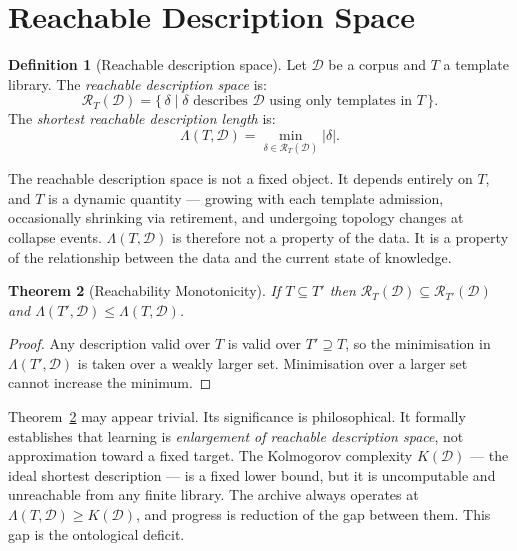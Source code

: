 \documentclass[11pt, a4paper, openany]{book}
\theoremstyle{plain}
\newtheorem{theorem}{Theorem}[chapter]
\theoremstyle{definition}
\newtheorem{definition}[theorem]{Definition}
\theoremstyle{remark}
\begin{document}
\section{Reachable Description Space}

\begin{definition}[Reachable description space]
  Let $\mathcal{D}$ be a corpus and $T$ a template library.
  The \emph{reachable description space} is:
  \[
    \mathcal{R}_T(\mathcal{D})
    = \bigl\{\, \delta \;\big|\;
      \delta \text{ describes } \mathcal{D}
      \text{ using only templates in } T \,\bigr\}.
  \]
  The \emph{shortest reachable description length} is:
  \[
    \Lambda(T, \mathcal{D})
    = \min_{\delta \in \mathcal{R}_T(\mathcal{D})} |\delta|.
  \]
\end{definition}

The reachable description space is not a fixed object.
It depends entirely on $T$, and $T$ is a dynamic quantity --- growing
with each template admission, occasionally shrinking via retirement,
and undergoing topology changes at collapse events.
$\Lambda(T, \mathcal{D})$ is therefore not a property of the data.
It is a property of the relationship between the data and the current
state of knowledge.

\begin{theorem}[Reachability Monotonicity]
  \label{thm:monotone}
  If $T \subseteq T'$ then
  $\mathcal{R}_T(\mathcal{D}) \subseteq \mathcal{R}_{T'}(\mathcal{D})$
  and
  $\Lambda(T', \mathcal{D}) \leq \Lambda(T, \mathcal{D})$.
\end{theorem}

\begin{proof}
  Any description valid over $T$ is valid over $T' \supseteq T$,
  so the minimisation in $\Lambda(T', \mathcal{D})$ is taken over
  a weakly larger set.
  Minimisation over a larger set cannot increase the minimum.
\end{proof}

Theorem~\ref{thm:monotone} may appear trivial.
Its significance is philosophical.
It formally establishes that learning is \emph{enlargement of reachable
description space}, not approximation toward a fixed target.
The Kolmogorov complexity $K(\mathcal{D})$ --- the ideal shortest description ---
is a fixed lower bound, but it is uncomputable and unreachable from any
finite library.
The archive always operates at $\Lambda(T, \mathcal{D}) \geq K(\mathcal{D})$,
and progress is reduction of the gap between them.
This gap is the ontological deficit.
\end{document}
